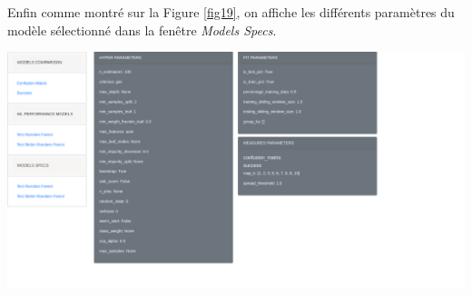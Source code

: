 Enfin comme montré sur la Figure \ref{fig19}, on affiche les différents paramètres du modèle sélectionné dans la fenêtre \textit{Models Specs}.

\begin{center}
\includegraphics[scale=0.30]{figures/app_specs.png}
\label{fig19}
\end{center}